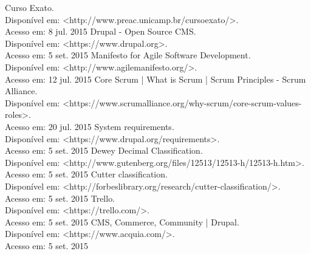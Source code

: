 \documentclass[a4paper]{article}
\begin{document}
\pagebreak
\begin{thebibliography}{9}
 Curso Exato.\\Disponível em: <http://www.preac.unicamp.br/cursoexato/>.\\Acesso em: 8 jul. 2015
 Drupal - Open Source CMS.\\Disponível em: <https://www.drupal.org>.\\Acesso em: 5 set. 2015
 Manifesto for Agile Software Development.\\Disponível em: <http://www.agilemanifesto.org/>.\\Acesso em: 12 jul. 2015
 Core Scrum | What is Scrum | Scrum Principles - Scrum Alliance.\\ Disponível em: <https://www.scrumalliance.org/why-scrum/core-scrum-values-roles>. \\Acesso em: 20 jul. 2015
 System requirements.\\Disponível em: <https://www.drupal.org/requirements>.\\Acesso em: 5 set. 2015
 Dewey Decimal Classification.\\Disponível em: <http://www.gutenberg.org/files/12513/12513-h/12513-h.htm>.\\Acesso em: 5 set. 2015
 Cutter classification.\\Disponível em: <http://forbeslibrary.org/research/cutter-classification/>.\\Acesso em: 5 set. 2015
 Trello.\\Disponível em: <https://trello.com/>.\\Acesso em: 5 set. 2015
 CMS, Commerce, Community | Drupal.\\Disponível em: <https://www.acquia.com/>.\\Acesso em: 5 set. 2015

\end{thebibliography}
\end{document}

